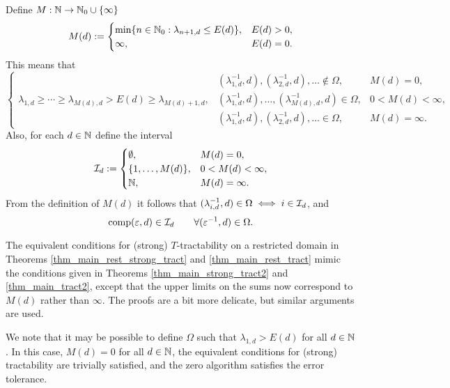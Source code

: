 \documentclass[11pt,a4paper]{article}
\renewcommand{\hI}{\ci}
\begin{document}
Define $M: \mathbb{N} \to \mathbb{N}_{0} \cup \{\infty\}$
\begin{equation} \label{eq:Mddef}
    M(d) := \begin{cases}
        \min\{n \in \mathbb{N}_{0} : \lambda_{n+1,d} \le E(d)\}, & E(d) > 0, \\
        \infty, & E(d) = 0.
    \end{cases}
\end{equation}
This means that 
\[
\left \{
\begin{array}{lll}
&(\lambda_{1,d}^{-1},d), (\lambda_{2,d}^{-1},d), \ldots \notin \Omega, & M(d) = 0, \\
\lambda_{1,d}\ge  \cdots \ge \lambda_{M(d),d} > E(d) \ge\lambda_{M(d)+1,d}, &
(\lambda_{1,d}^{-1},d), \ldots, (\lambda^{-1}_{M(d),d},d)  \in \Omega, & 0 < M(d) < \infty, \\
&
(\lambda_{1,d}^{-1},d), (\lambda_{2,d}^{-1},d), \ldots \in \Omega, & M(d) = \infty.
\end{array}
\right .
\]
Also, for each $d \in \mathbb{N}$ define the interval 
\begin{equation} \label{eq:hIdef}
\hI_{d}:=\begin{cases} 
\emptyset, & M(d) = 0, \\
\{1,\ldots, M(d)\}, & 0 < M(d) < \infty, \\
\naturals, & M(d) = \infty.
\end{cases}
\end{equation}
From the definition of $M(d)$ it follows that $(\lambda_{i,d}^{-1},d) \in \Omega  \iff i \in \hI_d$, and
\[
\comp(\varepsilon,d) \in \hI_d \qquad \forall (\varepsilon^{-1},d) \in \Omega.
\]

The equivalent conditions for (strong) $T$-tractability on a restricted domain in Theorems \ref{thm_main_rest_strong_tract} and \ref{thm_main_rest_tract} mimic the conditions given in Theorems \ref{thm_main_strong_tract2} and \ref{thm_main_tract2}, except that the upper limits on the sums now correspond to $M(d)$ rather than $\infty$.  The proofs are a bit more delicate, but similar arguments are used.  

We note that it may be possible to define $\Omega$ such that $\lambda_{1,d} > E(d)$ for all $d \in \mathbb{N}$. In this case, $M(d) = 0$ for all $d \in \mathbb{N}$, the equivalent conditions for (strong) tractability are trivially satisfied, and the zero algorithm satisfies the error tolerance.
\end{document}
